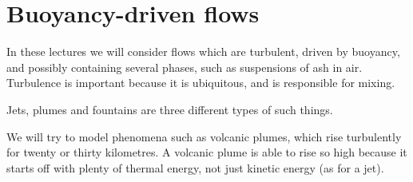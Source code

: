 \newpage
\chapter{Buoyancy-driven flows} \label{section-woods}

In these lectures we will consider flows which are turbulent, driven by
buoyancy, and possibly containing several phases, such as suspensions of ash in
air.  Turbulence is important because it is ubiquitous, and is responsible for
mixing.

Jets, plumes and fountains are three different types of such things.

We will try to model phenomena such as volcanic plumes, which rise turbulently
for twenty or thirty kilometres. A volcanic plume is able to rise so high
because it starts off with plenty of thermal energy, not just kinetic energy (as
for a jet). 


